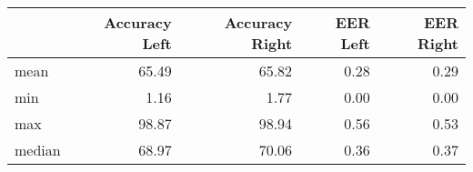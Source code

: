 \begin{tabular}{lrrrr}
\toprule
{} &  Accuracy Left &  Accuracy Right &  EER Left &  EER Right \\
\midrule
mean   &          65.49 &           65.82 &      0.28 &       0.29 \\
min    &           1.16 &            1.77 &      0.00 &       0.00 \\
max    &          98.87 &           98.94 &      0.56 &       0.53 \\
median &          68.97 &           70.06 &      0.36 &       0.37 \\
\bottomrule
\end{tabular}
